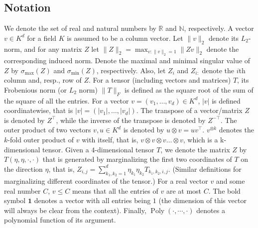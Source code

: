 \documentclass{article} %
\newcommand{\real}{\mathbb{R}}
\renewcommand{\natural}{\mathbb{N}}
\DeclareMathOperator{\pol}{Poly}
\newcommand{\poly}[1]{\pol\left(#1\right)}
\theoremstyle{definition}
\begin{document}
\subsection{Notation}
We denote the set of real and natural numbers by $\real$ and $\natural$, respectively.
A vector $v \in K^d$ for a field $K$ is assumed to be a column vector.
Let $\|v\|_2$ denote its $L_2$-norm, and for any matrix $Z$ let $\|Z\|_2=\max_{v:\|v\|_2=1}{\|Z v\|_2}$ denote the corresponding induced norm. Denote the maximal and minimal singular value of $Z$ by $\sigma_{\max}(Z)$ and  $\sigma_{\min}(Z)$, respectively. Also, let $Z_i$ and $Z_{i:}$ denote the $i$th column and, resp., row of $Z$.
For a tensor (including vectors and matrices) $T$, its Frobenious norm (or $L_2$ norm) $\|T\|_F$  is defined as the square root of the sum of the square of all the entries.  
For a vector $v=(v_1,\ldots,v_d) \in K^d$, $\vert v \vert$ is defined coordinatewise, that is $\vert v \vert=(\vert v_1 \vert,\ldots,\vert v_d\vert)$. 
The transpose of a vector/matrix $Z$ is denoted by $Z^\top$, while the inverse of the transpose is denoted by $Z^{-\top}$.  
The outer product of two vectors $v, u \in K^d$ is denoted by $u\otimes v=u v^\top$. 
$v^{\otimes k}$ denotes the $k$-fold outer product of $v$ with itself, that is, $v\otimes v\otimes v \ldots \otimes v$, which is a k-dimensional tensor.
Given a $4$-dimensional tensor $T$, we denote the matrix $Z$ by $T(\eta,\eta,\cdot , \cdot)$ that is generated by marginalizing the first two coordinates of $T$ on the direction $\eta$, that is,
$Z_{i,j} = \sum_{k_1,k_2 = 1}^{d} \eta_{k_1} \eta_{k_2} T_{k_1,k_2,i,j}$. (Similar definitions for marginalizing different coordinates of the tensor.)
For a real vector $v$ and some real number $C$, $v \le C$ means that all the entries of $v$ are at most $C$. 
The bold symbol $\boldsymbol{1}$ denotes a vector with all entries being $1$ (the dimension of this vector will always be clear from the context).
Finally, $\poly{\cdot,\cdots,\cdot}$ denotes a polynomial function of its argument.
\end{document}
